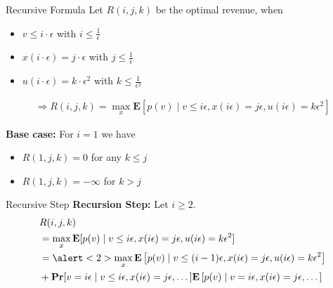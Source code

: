 \documentclass{beamer}
\begin{document}
\begin{frame}{Recursive Formula}
  Let $R(i,j,k)$ be the optimal revenue, when
  \begin{itemize}
    \item $v \leq i \cdot \epsilon$ with $i \leq \frac{1}{\epsilon}$
    \item $x(i \cdot \epsilon) = j \cdot \epsilon$ with $j \leq \frac{1}{\epsilon}$
    \item $u(i \cdot \epsilon) = k \cdot \epsilon^2$ with $k \leq \frac{1}{\epsilon^2}$
  \end{itemize}
  \begin{align*}
    \Rightarrow R(i,j,k) = \max_x \mathbf{E}[p(v) \mid v \leq i \epsilon, x(i\epsilon) = j\epsilon, u(i\epsilon) = k\epsilon^2]
  \end{align*}

  \textbf{Base case:}
  For $i = 1$ we have
  \begin{itemize}
    \item $R(1,j,k) = 0$ for any $k \leq j$
    \item $R(1,j,k) = -\infty$ for $k > j$
  \end{itemize}
\end{frame}

\begin{frame}{Recursive Step}
  \textbf{Recursion Step:}
  Let $i \geq 2$.
  \begin{align*}
     & R(i,j,k)                                                                                                                                                               \\
     & = \max_x \mathbf{E}[p(v) \mid v \leq i \epsilon, x(i\epsilon) = j\epsilon, u(i\epsilon) = k\epsilon^2]                                                                 \\
     & = \alert<2>{\max_x \mathbf{E}\left[p(v) \mid v \leq (i - 1) \epsilon, x(i\epsilon) = j\epsilon, u(i\epsilon) = k\epsilon^2 \right]}                                    \\
     & + \mathbf{Pr}[v = i\epsilon \mid v \leq i \epsilon, x(i\epsilon) = j\epsilon, \dots ] \mathbf{E}\left[p(v) \mid v = i\epsilon, x(i\epsilon) = j\epsilon, \dots \right]
  \end{align*}
\end{frame}
\end{document}
